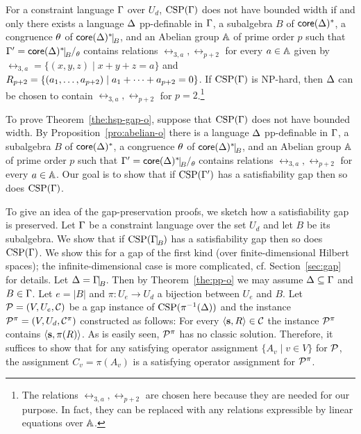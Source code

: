 \documentclass[11pt,letter]{article}
\begin{document}
\begin{prop}\label{pro:abelian-o}
For a constraint language $\Gamma$ over $U_d$, ${\rm CSP}(\Gamma)$ does not have bounded
  width if and only there exists a language $\Delta$ pp-definable in $\Gamma$, a
  subalgebra $B$ of $\mathsf{core}(\Delta)^*$, a congruence $\theta$ of $\core(\Dl)^*\red B$,
  and an Abelian group ${\mathbb A}$ of prime order $p$ such that $\Gm'=\core(\Dl)^*\red B\fac\th$ contains relations $\rel_{3,a},\rel_{p+2}$ for every $a\in{\mathbb A}$ given by $\rel_{3,a}=\{(x,y,z)\mid x+y+z=a\}$ and $R_{p+2}=\{(a _1,\ldots, a _{p+2})\mid a_1+\dots+a_{p+2}=0\}$. If ${\rm CSP}(\Gamma)$ is NP-hard, then $\Delta$ can be chosen to contain $\rel_{3,a},\rel_{p+2}$ for $p=2$.\footnote{The relations $\rel_{3,a},\rel_{p+2}$ are chosen here because they are needed for our purpose. In fact, they can be replaced with any relations expressible by linear equations over ${\mathbb A}$.}
\end{prop}

To prove Theorem~\ref{the:hsp-gap-o}, suppose that ${\rm CSP}(\Gamma)$ does not have
bounded width. 
By Proposition~\ref{pro:abelian-o} there is 
a language $\Delta$ pp-definable in $\Gamma$, a subalgebra $B$ of $\mathsf{core}(\Delta)^*$, a congruence
$\theta$ of $\core(\Dl)^*\red B$, and an Abelian group ${\mathbb A}$ of prime order $p$
such that $\Gm'=\core(\Dl)^*\red B\fac\th$ contains relations $\rel_{3,a},\rel_{p+2}$
for every $a\in{\mathbb A}$.
Our goal is to show that if ${\rm CSP}(\Gamma')$ has a satisfiability gap
then so does ${\rm CSP}(\Gamma)$. 


To give an idea of the gap-preservation proofs, we sketch how a satisfiability
gap is preserved.
Let $\Gamma$ be a constraint language over the set $U_d$ and let $B$ be its subalgebra.
We show that if $\CSP(\Gm\red B)$ has a satisfiability gap then so does
${\rm CSP}(\Gamma)$. We show this for a gap of the first kind (over finite-dimensional Hilbert spaces); the infinite-dimensional case is more complicated, cf. Section~\ref{sec:gap} for details.
Let $\Dl=\Gm\red B$. Then by Theorem~\ref{the:pp-o} we may assume $\Delta\subseteq\Gamma$ and $B\in\Gamma$. Let $e=|B|$ and $\pi:U_e\to U_d$ a bijection between $U_e$ and $B$. 
Let ${\mathcal P}=(V,U_e,{\mathcal C})$ be a gap instance of ${\rm CSP}(\pi^{-1}(\Delta))$ and the instance ${\mathcal P}^\pi=(V,U_d,{\mathcal C}^\pi)$ constructed as follows: For every $\langle {\bf s},R \rangle\in{\mathcal C}$ the instance ${\mathcal P}^\pi$ contains $\langle {\bf s},\pi(R) \rangle$. As is easily seen, ${\mathcal P}^\pi$ has no classic solution. Therefore, it suffices to show that for any satisfying operator assignment $\{A_v\mid v\in V\}$ for ${\mathcal P}$, the assignment $C_v=\pi(A_v)$ is a satisfying operator assignment for ${\mathcal P}^\pi$.
\end{document}

